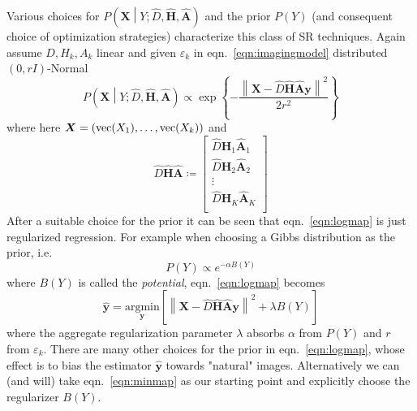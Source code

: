 %
Various choices for $P\left(\bm{X} \middle| Y; \hat{D},  \hat{\bm{H}}, \hat{\bm{A}} \right)$ and the prior $P(Y)$ (and consequent choice of optimization strategies) characterize this class of SR techniques.
%
Again assume $D, H_k, A_k$ linear and given $\varepsilon_k$ in eqn.~\eqref{eqn:imagingmodel} distributed $(0, rI)$-Normal
\begin{equation}
    P\left(\bm{X} \middle| Y; \hat{D},  \hat{\bm{H}}, \hat{\bm{A}} \right) \propto \exp \left\{ -\frac{\left\| \bm{X} - \hat{D} \hat{\bm{H}} \hat{\bm{A}} \bm{y} \right\|^2}{2r^2} \right\}
\end{equation}
where here $\bm{X} = \left( \text{vec}(X_1), \mathellipsis, \text{vec}(X_k) \right)$ and
\begin{equation}
    \hat{D} \hat{\bm{H}} \hat{\bm{A}} \coloneqq \begin{bmatrix}
                                                    \hat{D} \hat{\bm{H}}_1 \hat{\bm{A}}_1 \\
                                                    \hat{D} \hat{\bm{H}}_2 \hat{\bm{A}}_2 \\
                                                    \vdots \\
                                                    \hat{D} \hat{\bm{H}}_K \hat{\bm{A}}_K \\
    \end{bmatrix}
\end{equation}
%
After a suitable choice for the prior it can be seen that eqn.~\eqref{eqn:logmap} is just regularized regression.
%
For example when choosing a Gibbs\cite{Hardie1997} distribution as the prior, i.e.
\begin{equation}
    P(Y) \propto e^{-\alpha B(Y)}
    \label{eqn:gibbs}
\end{equation}
where $B(Y)$ is called the \textit{potential}, eqn.~\eqref{eqn:logmap} becomes
\begin{equation}
    \hat{\bm{y}} = \underset{\bm{y}}{\text{argmin}}\left[ \left\| \bm{X} - \hat{D} \hat{\bm{H}} \hat{\bm{A}} \bm{y} \right\|^2 +\lambda B(Y)\right]
    \label{eqn:minmap}
\end{equation}
where the aggregate regularization parameter $\lambda$ absorbs $\alpha$ from $P(Y)$ and $r$ from $\varepsilon_k$.
%
There are many other choices for the prior in eqn.~\eqref{eqn:logmap}, whose effect is to bias the estimator $\hat{\bm{y}}$ towards "natural" images.
%
Alternatively we can (and will) take eqn.~\eqref{eqn:minmap} as our starting point and explicitly choose the regularizer $B(Y)$.

